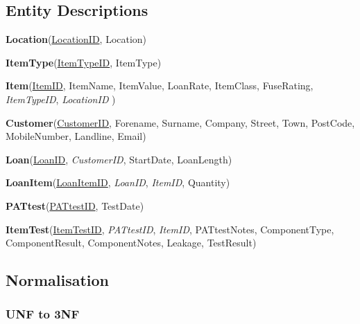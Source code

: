 \subsection{Entity Descriptions}

\noindent \textbf{Location}(\underline{LocationID}, Location)

\noindent \textbf{ItemType}(\underline{ItemTypeID}, ItemType)

\noindent \textbf{Item}(\underline{ItemID}, ItemName, ItemValue, LoanRate, ItemClass, FuseRating,\\ \emph{ItemTypeID}, \emph{LocationID} )

\noindent \textbf{Customer}(\underline{CustomerID}, Forename, Surname, Company, Street, Town, PostCode, MobileNumber, Landline, Email)

\noindent \textbf{Loan}(\underline{LoanID}, \emph{CustomerID}, StartDate, LoanLength)

\noindent \textbf{LoanItem}(\underline{LoanItemID}, \emph{LoanID}, \emph{ItemID}, Quantity)

\noindent \textbf{PATtest}(\underline{PATtestID}, TestDate)

\noindent \textbf{ItemTest}(\underline{ItemTestID}, \emph{PATtestID}, \emph{ItemID}, PATtestNotes, ComponentType, ComponentResult, ComponentNotes, Leakage, TestResult)

\subsection{Normalisation}

\subsubsection{UNF to 3NF}

